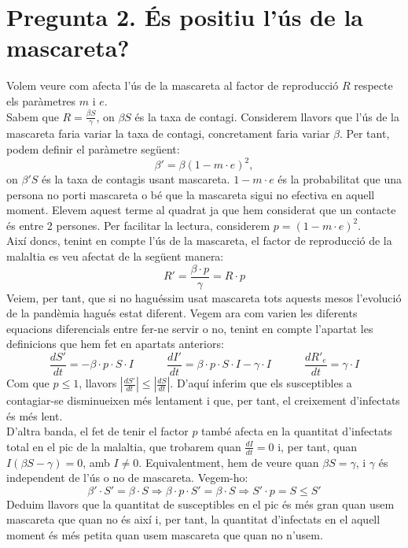 \documentclass[a4paper, 11pt]{article}
\begin{document}
\section{Pregunta 2. És positiu l'ús de la mascareta?}
  Volem veure com afecta l'ús de la mascareta al factor de reproducció $R$ respecte els paràmetres $m$ i $e$.\\
  Sabem que $R = \frac{\beta S}{\gamma}$, on $\beta S$ és la taxa de contagi. Considerem llavors que l'ús de la mascareta faria variar la taxa de contagi, concretament faria variar $\beta$. Per tant, podem definir el paràmetre següent:
  \begin{equation}
    \beta ' = \beta {\left( 1 - m \cdot e \right)}^2,
  \end{equation}
  on $\beta ' S$ és la taxa de contagis usant mascareta. $1 - m \cdot e$ és la probabilitat que una persona no porti mascareta o bé que la mascareta sigui no efectiva en aquell moment. Elevem aquest terme al quadrat ja que hem considerat que un contacte és entre 2 persones. Per facilitar la lectura, considerem $p = {\left( 1 - m \cdot e \right)}^2$.\\
  Així doncs, tenint en compte l'ús de la mascareta, el factor de reproducció de la malaltia es veu afectat de la següent manera:
  \begin{equation}
    R' = \frac{\beta \cdot p}{\gamma} = R \cdot p
  \end{equation}
  Veiem, per tant, que si no haguéssim usat mascareta tots aquests mesos l'evolució de la pandèmia hagués estat diferent. Vegem ara com varien les diferents equacions diferencials entre fer-ne servir o no, tenint en compte l'apartat les definicions que hem fet en apartats anteriors:
  \begin{equation}
    \frac{dS'}{dt} = - \beta \cdot p \cdot S \cdot I \quad \quad \quad \frac{dI'}{dt} = \beta \cdot p \cdot S \cdot I - \gamma \cdot I \quad \quad \quad \frac{dR'_e}{dt} = \gamma \cdot I
  \end{equation}
  Com que $p \leq 1$, llavors $\left| \frac{dS'}{dt} \right| \leq \left| \frac{dS}{dt} \right|$. D'aquí inferim que els susceptibles a contagiar-se disminueixen més lentament i que, per tant, el creixement d'infectats és més lent.\\
  D'altra banda, el fet de tenir el factor $p$ també afecta en la quantitat d'infectats total en el pic de la malaltia, que trobarem quan $\frac{dI}{dt} = 0$ i, per tant, quan $I \left( \beta S - \gamma \right) = 0$, amb $I \neq 0$. Equivalentment, hem de veure quan $\beta S = \gamma$, i $\gamma$ és independent de l'ús o no de mascareta. Vegem-ho:
  \begin{equation}
    \beta' \cdot S' = \beta \cdot S \Longrightarrow \beta \cdot p \cdot S' = \beta \cdot S \Longrightarrow S' \cdot p = S \leq S'
  \end{equation}
  Deduim llavors que la quantitat de susceptibles en el pic és més gran quan usem mascareta que quan no és així i, per tant, la quantitat d'infectats en el aquell moment és més petita quan usem mascareta que quan no n'usem.
\end{document}
